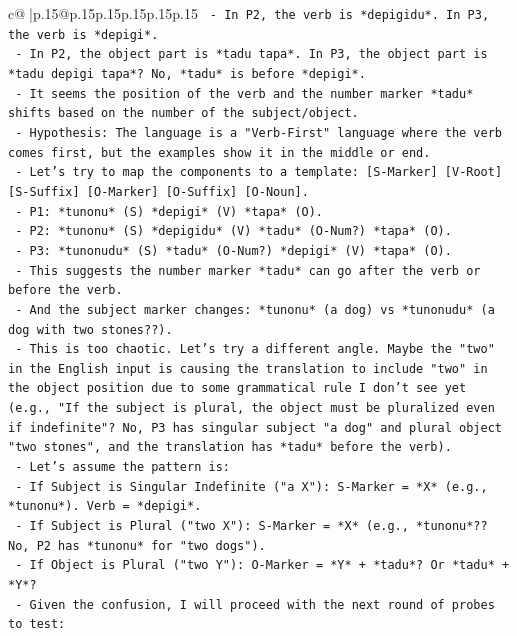 \documentclass{article}
\begin{document}
{\begin{supertabular}{c@{$\;$}|p{.15\linewidth}@{}p{.15\linewidth}p{.15\linewidth}p{.15\linewidth}p{.15\linewidth}p{.15\linewidth}}
{{{\texttt{        {-} In P2, the verb is *depigidu*. In P3, the verb is *depigi*.} \\
\texttt{        {-} In P2, the object part is *tadu tapa*. In P3, the object part is *tadu depigi tapa*? No, *tadu* is before *depigi*.} \\
\texttt{        {-} It seems the position of the verb and the number marker *tadu* shifts based on the number of the subject/object.} \\
\texttt{        {-} Hypothesis: The language is a "Verb{-}First" language where the verb comes first, but the examples show it in the middle or end.} \\
\texttt{        {-} Let's try to map the components to a template: {[}S{-}Marker{]} {[}V{-}Root{]} {[}S{-}Suffix{]} {[}O{-}Marker{]} {[}O{-}Suffix{]} {[}O{-}Noun{]}.} \\
\texttt{        {-} P1: *tunonu* (S) *depigi* (V) *tapa* (O).} \\
\texttt{        {-} P2: *tunonu* (S) *depigidu* (V) *tadu* (O{-}Num?) *tapa* (O).} \\
\texttt{        {-} P3: *tunonudu* (S) *tadu* (O{-}Num?) *depigi* (V) *tapa* (O).} \\
\texttt{        {-} This suggests the number marker *tadu* can go after the verb or before the verb.} \\
\texttt{        {-} And the subject marker changes: *tunonu* (a dog) vs *tunonudu* (a dog with two stones??).} \\
\texttt{        {-} This is too chaotic. Let's try a different angle. Maybe the "two" in the English input is causing the translation to include "two" in the object position due to some grammatical rule I don't see yet (e.g., "If the subject is plural, the object must be pluralized even if indefinite"? No, P3 has singular subject "a dog" and plural object "two stones", and the translation has *tadu* before the verb).} \\
\texttt{        {-} Let's assume the pattern is:} \\
\texttt{          {-} If Subject is Singular Indefinite ("a X"): S{-}Marker = *X* (e.g., *tunonu*). Verb = *depigi*.} \\
\texttt{          {-} If Subject is Plural ("two X"): S{-}Marker = *X* (e.g., *tunonu*?? No, P2 has *tunonu* for "two dogs").} \\
\texttt{          {-} If Object is Plural ("two Y"): O{-}Marker = *Y* + *tadu*? Or *tadu* + *Y*?} \\
\texttt{        {-} Given the confusion, I will proceed with the next round of probes to test:} \\
}}}
\end{supertabular}}
\end{document}

